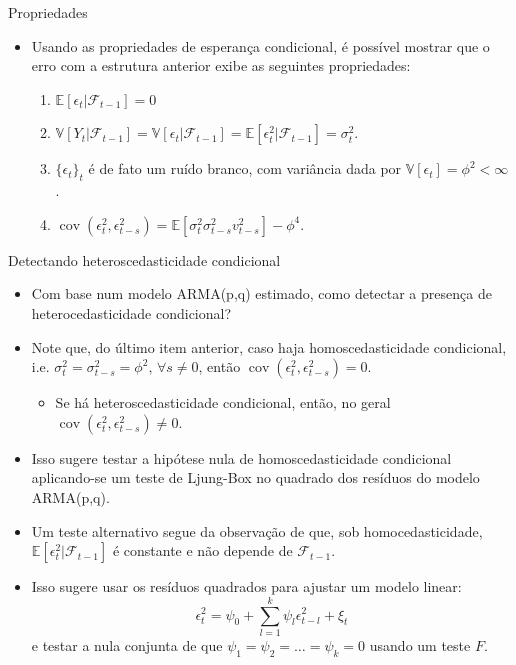 \documentclass[11pt]{beamer}
\begin{document}
\begin{frame}{Propriedades }
\begin{itemize}
	\item Usando as propriedades de esperança condicional, é possível mostrar que o erro com a estrutura anterior exibe as seguintes propriedades:
	\begin{enumerate}
		\item $\mathbb{E}[\epsilon_t|\mathcal{F}_{t-1}] = 0$
		\item $\mathbb{V}[Y_t|\mathcal{F}_{t-1}]  = \mathbb{V}[\epsilon_t|\mathcal{F}_{t-1}] = \mathbb{E}[\epsilon_t^2|\mathcal{F}_{t-1}] = \sigma^2_t$.
		\item $\{\epsilon_t\}_t$ é de fato um ruído branco, com variância dada por $\mathbb{V}[\epsilon_t] = \phi^2 < \infty$. 
		\item $\operatorname{cov}(\epsilon_t^2, \epsilon_{t-s}^2) =\mathbb{E}[\sigma^2_t \sigma^2_{t-s} v_{t-s}^2] -  \phi^4$.
	\end{enumerate}
\end{itemize}
\end{frame}


\begin{frame}{Detectando heteroscedasticidade condicional}
\begin{itemize}
	\item Com base num modelo ARMA(p,q) estimado, como detectar a presença de heterocedasticidade condicional?
	\item Note que, do último item anterior, caso haja homoscedasticidade condicional, i.e. $\sigma^2_t=\sigma^2_{t-s} = \phi^2$, $\forall s \neq 0$, então $\operatorname{cov}(\epsilon_t^2, \epsilon_{t-s}^2)= 0$.
	\begin{itemize}
		\item Se há heteroscedasticidade condicional, então, no geral $\operatorname{cov}(\epsilon_t^2, \epsilon_{t-s}^2) \neq 0$.
	\end{itemize}
	\item Isso sugere testar a hipótese nula de homoscedasticidade condicional aplicando-se um {\color{blue}teste de Ljung-Box no quadrado dos resíduos} do modelo ARMA(p,q).
	\item Um teste alternativo segue da observação de que, sob homocedasticidade, $\mathbb{E}[\epsilon_t^2|\mathcal{F}_{t-1}]$ é constante e não depende de $\mathcal{F}_{t-1}$.
	\item Isso sugere usar os resíduos quadrados para ajustar um modelo linear:
	$$ \epsilon_t^2  = \psi_0 + \sum_{l=1}^k \psi_l \epsilon_{t-l}^2 + \xi_t$$
	e testar a nula  conjunta de que $\psi_1 = \psi_2 =\ldots = \psi_k=0$ usando um teste $F$.
\end{itemize}
\end{frame}
\end{document}
